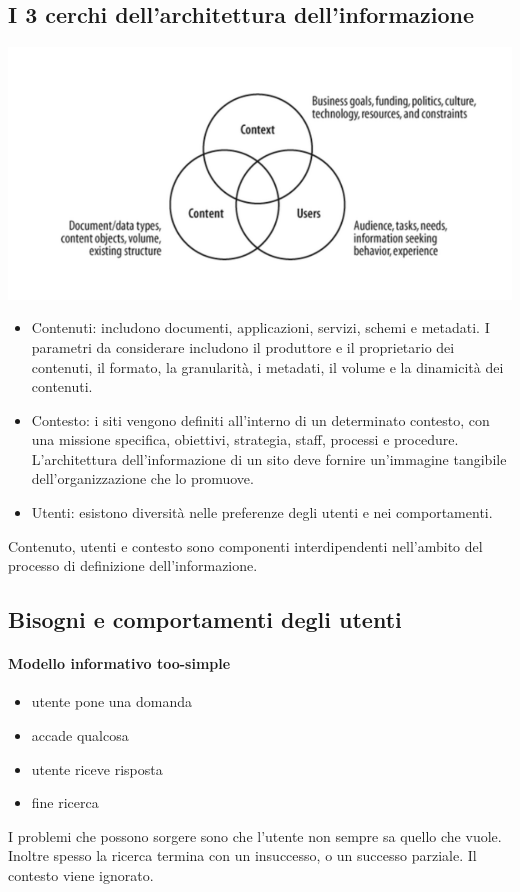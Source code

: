 \documentclass{article}
\begin{document}
\subsection{I 3 cerchi dell'architettura dell'informazione}
\includegraphics[scale=0.5]{3cerchi}
\begin{itemize}
\item Contenuti: includono documenti, applicazioni, servizi, schemi e metadati. I parametri da considerare includono il produttore e il proprietario dei contenuti, il formato, la granularità, i metadati, il volume e la dinamicità dei contenuti.
\item Contesto: i siti vengono definiti all'interno di un determinato contesto, con una missione specifica, obiettivi, strategia, staff, processi e procedure. L'architettura dell'informazione di un sito deve fornire un'immagine tangibile dell'organizzazione che lo promuove.
\item Utenti: esistono diversità nelle preferenze degli utenti e nei comportamenti.
\end{itemize}
Contenuto, utenti e contesto sono componenti interdipendenti nell'ambito del processo di definizione dell'informazione.
\subsection{Bisogni e comportamenti degli utenti}
\paragraph{Modello informativo too-simple}
\begin{itemize}
\item utente pone una domanda
\item accade qualcosa
\item utente riceve risposta
\item fine ricerca
\end{itemize}
I problemi che possono sorgere sono che l'utente non sempre sa quello che vuole. Inoltre spesso la ricerca termina con un insuccesso, o un successo parziale. Il contesto viene ignorato.
\end{document}
